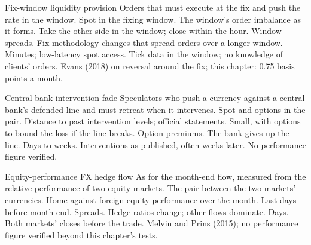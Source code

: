 \begin{strategyfile}{Fix-window liquidity provision}\label{strat:s2:fx-flow-strategies:fix}
 Orders that must execute at the fix and push the rate in the window.
 Spot in the fixing window.
 The window's order imbalance as it forms.
 Take the other side in the window; close within the hour.
 Window spreads.
 Fix methodology changes that spread orders over a longer window.
 Minutes; low-latency spot access.
 Tick data in the window; no knowledge of clients' orders.
 Evans (2018) on reversal around the fix; this chapter: 0.75 basis points a month.
\end{strategyfile}

\begin{strategyfile}{Central-bank intervention fade}\label{strat:s2:fx-flow-strategies:cb}
 Speculators who push a currency against a central bank's defended line and must retreat when it intervenes.
 Spot and options in the pair.
 Distance to past intervention levels; official statements.
 Small, with options to bound the loss if the line breaks.
 Option premiums.
 The bank gives up the line.
 Days to weeks.
 Interventions as published, often weeks later.
 No performance figure verified.
\end{strategyfile}

\begin{strategyfile}{Equity-performance FX hedge flow}\label{strat:s2:fx-flow-strategies:equityhedge}
 As for the month-end flow, measured from the relative performance of two equity markets.
 The pair between the two markets' currencies.
 Home against foreign equity performance over the month.
 Last days before month-end.
 Spreads.
 Hedge ratios change; other flows dominate.
 Days.
 Both markets' closes before the trade.
 Melvin and Prins (2015); no performance figure verified beyond this chapter's tests.
\end{strategyfile}

